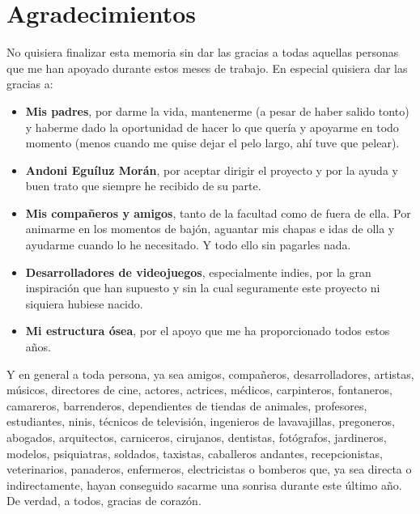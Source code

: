 \chapter*{Agradecimientos}

No quisiera finalizar esta memoria sin dar las gracias a todas aquellas personas que me han apoyado durante estos meses de trabajo. En especial quisiera dar las gracias a:

\begin{itemize}

	\item \textbf{Mis padres}, por darme la vida, mantenerme (a pesar de haber salido tonto) y haberme dado la oportunidad de hacer lo que quería y apoyarme en todo momento (menos cuando me quise dejar el pelo largo, ahí tuve que pelear).

	\item \textbf{Andoni Eguíluz Morán}, por aceptar dirigir el proyecto y por la ayuda y buen trato que siempre he recibido de su parte.

	\item \textbf{Mis compañeros y amigos}, tanto de la facultad como de fuera de ella. Por animarme en los momentos de bajón, aguantar mis chapas e idas de olla y ayudarme cuando lo he necesitado. Y todo ello sin pagarles nada.

	\item \textbf{Desarrolladores de videojuegos}, especialmente indies, por la gran inspiración que han supuesto y sin la cual seguramente este proyecto ni siquiera hubiese nacido.

	\item \textbf{Mi estructura ósea}, por el apoyo que me ha proporcionado todos estos años.

\end{itemize}

Y en general a toda persona, ya sea amigos, compañeros, desarrolladores, artistas, músicos, directores de cine, actores, actrices, médicos, carpinteros, fontaneros, camareros, barrenderos, dependientes de tiendas de animales, profesores, estudiantes, ninis, técnicos de televisión, ingenieros de lavavajillas, pregoneros, abogados, arquitectos, carniceros, cirujanos, dentistas, fotógrafos, jardineros, modelos, psiquiatras, soldados, taxistas, caballeros andantes, recepcionistas, veterinarios, panaderos, enfermeros, electricistas o bomberos que, ya sea directa o indirectamente, hayan conseguido sacarme una sonrisa durante este último año. De verdad, a todos, gracias de corazón.